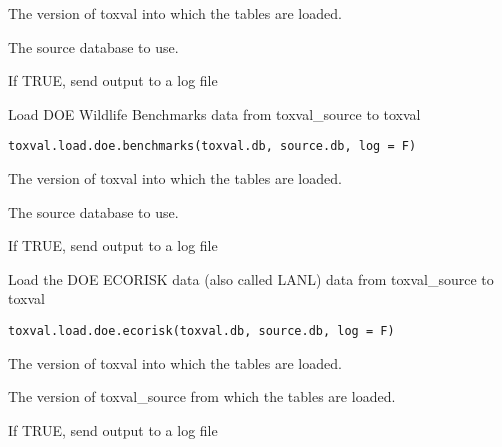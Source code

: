 \documentclass[letterpaper]{book}
\begin{document}
%
\begin{Arguments}
\begin{ldescription}
\item[\code{toxval.db}] The version of toxval into which the tables are loaded.

\item[\code{source.db}] The source database to use.

\item[\code{log}] If TRUE, send output to a log file
\end{ldescription}
\end{Arguments}
%
\begin{Description}\relax
Load DOE Wildlife Benchmarks data from toxval\_source to toxval
\end{Description}
%
\begin{Usage}
\begin{verbatim}
toxval.load.doe.benchmarks(toxval.db, source.db, log = F)
\end{verbatim}
\end{Usage}
%
\begin{Arguments}
\begin{ldescription}
\item[\code{toxval.db}] The version of toxval into which the tables are loaded.

\item[\code{source.db}] The source database to use.

\item[\code{log}] If TRUE, send output to a log file
\end{ldescription}
\end{Arguments}
%
\begin{Description}\relax
Load the DOE ECORISK data (also called LANL) data from toxval\_source to toxval
\end{Description}
%
\begin{Usage}
\begin{verbatim}
toxval.load.doe.ecorisk(toxval.db, source.db, log = F)
\end{verbatim}
\end{Usage}
%
\begin{Arguments}
\begin{ldescription}
\item[\code{toxval.db}] The version of toxval into which the tables are loaded.

\item[\code{source.db}] The version of toxval\_source from which the tables are loaded.

\item[\code{log}] If TRUE, send output to a log file
\end{ldescription}
\end{Arguments}
\end{document}
